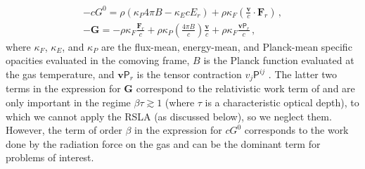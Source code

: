 \documentclass[fleqn,usenatbib]{mnras}
\newcommand{\vc}[1]{{\mathbf{#1}}}
\begin{document}
\begin{align}
-c G^0 = \rho (\kappa_P 4 \pi B - \kappa_E c E_r) + \rho \kappa_F \left( \frac{\vc{v}}{c} \cdot \vc{F}_r \right) \, , \\
-\vc{G} = -\rho \kappa_F \frac{\vc{F}_r}{c} + \rho \kappa_P \left(\frac{4 \pi B}{c}\right) \frac{\vc{v}}{c} + \rho \kappa_F \frac{\vc{v}\mathsf{P}_r}{c} \, ,
\end{align}
where
$\kappa_F$, $\kappa_E$, and $\kappa_P$ are the flux-mean, energy-mean, and Planck-mean specific opacities evaluated in the comoving frame,
$B$ is the Planck function evaluated at the gas temperature,
and $\vc{v} \mathsf{P}_r$ is the tensor contraction $v_j \mathsf{P}^{ij}$ \citep{Mihalas_1984}. The latter two terms in the expression for $\vc{G}$ correspond to the relativistic work term of \cite{Krumholz_2007} and are only important in the regime $\beta \tau \gtrsim 1$ (where $\tau$ is a characteristic optical depth), 
to which we cannot apply the RSLA (as discussed below),
so we neglect them. However, the term of order $\beta$ in the expression for $cG^0$ corresponds to the work done by the radiation force on the gas and can be the dominant term for problems of interest. 
\end{document}
